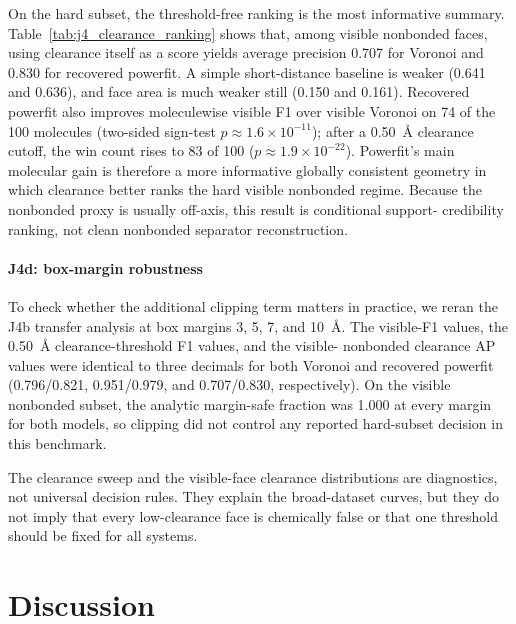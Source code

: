 \documentclass[preprint,12pt]{elsarticle}
\begin{document}
On the hard subset, the threshold-free ranking is the most informative
summary. Table~\ref{tab:j4_clearance_ranking} shows that, among visible
nonbonded faces, using clearance itself as a score yields average precision
0.707 for Voronoi and 0.830 for recovered powerfit. A simple short-distance
baseline is weaker (0.641 and 0.636), and face area is much weaker still
(0.150 and 0.161). Recovered powerfit also improves moleculewise visible F1
over visible Voronoi on 74 of the 100 molecules (two-sided sign-test
$p\approx 1.6\times 10^{-11}$); after a 0.50~\AA{} clearance cutoff, the win
count rises to 83 of 100 ($p\approx 1.9\times 10^{-22}$). Powerfit's main
molecular gain is therefore a more informative globally consistent geometry in
which clearance better ranks the hard visible nonbonded regime. Because the
nonbonded proxy is usually off-axis, this result is conditional support-
credibility ranking, not clean nonbonded separator reconstruction.



\paragraph{J4d: box-margin robustness}
To check whether the additional clipping term matters in practice, we reran the
J4b transfer analysis at box margins 3, 5, 7, and 10~\AA{}. The visible-F1
values, the 0.50~\AA{} clearance-threshold F1 values, and the visible-
nonbonded clearance AP values were identical to three decimals for both Voronoi
and recovered powerfit (0.796/0.821, 0.951/0.979, and 0.707/0.830,
respectively). On the visible nonbonded subset, the analytic margin-safe
fraction was 1.000 at every margin for both models, so clipping did not
control any reported hard-subset decision in this benchmark.

The clearance sweep and the visible-face clearance distributions are
diagnostics, not universal decision rules. They explain the broad-dataset
curves, but they do not imply that every low-clearance face is chemically false
or that one threshold should be fixed for all systems.

\FloatBarrier
\section{Discussion}
\label{sec:discussion}
\end{document}
